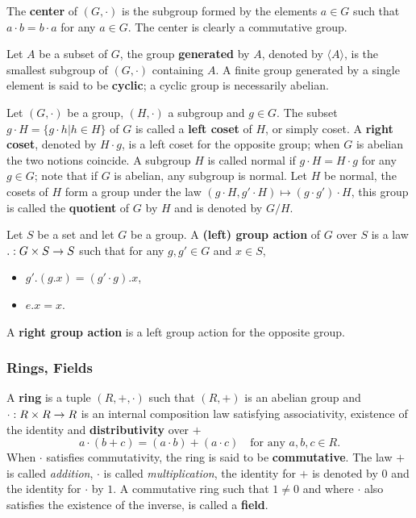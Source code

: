 The  \textbf{center} of
$(G,\cdot)$ is the subgroup formed by the elements $a\in G$ such that
$a\cdot b=b\cdot a$ for any $a\in G$. The center is clearly a
commutative group.

Let $A$ be a subset of $G$, the group
\textbf{generated}
by $A$, denoted by $\langle A\rangle$, is the smallest subgroup of
$(G,\cdot)$ containing $A$. A finite group generated by a single
element is said to be
\textbf{cyclic}; a cyclic
group is necessarily abelian.

Let $(G,\cdot)$ be a group, $(H,\cdot)$ a subgroup and $g\in G$. The
subset $g\cdot H = \{g\cdot h | h \in H \}$ of $G$ is called a
\textbf{left coset} of $H$, or simply
coset. A \textbf{right coset},
denoted by $H\cdot g$, is a left coset for the opposite group; when
$G$ is abelian the two notions coincide. A subgroup $H$ is called
normal if $g\cdot H=H\cdot g$ for any $g\in G$;
note that if $G$ is abelian, any subgroup is normal. Let $H$ be
normal, the cosets of $H$ form a group under the law $(g\cdot
H,g'\cdot H)\mapsto (g\cdot g')\cdot H$, this group is called the
\textbf{quotient} of $G$ by $H$ and is
denoted by $G/H$.

Let $S$ be a set and let $G$ be a group. A
\textbf{(left) group action} of $G$ over $S$ is a
law $.:G\times S\rightarrow S$ such that for any $g,g'\in G$ and $x\in S$,
\begin{itemize}
\item $g'.(g.x) = (g'\cdot g). x$,
\item $e. x = x$.
\end{itemize}
A \textbf{right group action}
is a left group action for the opposite group.


\subsubsection{Rings, Fields}

A \textbf{ring} is a tuple $(R,+,\cdot)$ such that $(R,+)$
is an abelian group and $\cdot:R\times R\rightarrow R$ is an internal
composition law satisfying associativity, existence of the identity
and \textbf{distributivity} over $+$
\[a \cdot (b + c) = (a\cdot b) + (a\cdot c) \quad\text{for any
  $a,b,c\in R$.}\] When $\cdot$ satisfies commutativity, the ring is
said to be \textbf{commutative}.  The law $+$
is called \emph{addition}, $\cdot$ is called \emph{multiplication},
the identity for $+$ is denoted by $0$ and the identity for $\cdot$ by
$1$.  A commutative ring such that $1\ne 0$ and where $\cdot$ also
satisfies the existence of the inverse, is called a
\textbf{field}.

